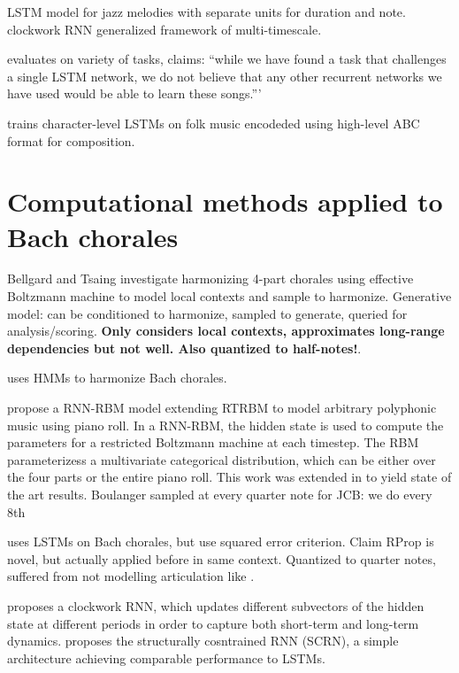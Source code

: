 \documentclass[dissertation.tex]{subfiles}
\begin{document}
LSTM model for jazz melodies with separate units for duration and note\cite{franklin2005jazz}.
\cite{Koutnik2014} clockwork RNN generalized framework of multi-timescale.

\cite{franklin2006recurrent} evaluates on variety of tasks, claims: ``while we have found a task
that challenges a single LSTM network, we do not believe that any other recurrent networks we have used
would be able to learn these songs.'''

\cite{sturm2015folk} \cite{sturm2016music} trains character-level LSTMs on folk
music encodeded using high-level ABC format for composition.

\section{Computational methods applied to Bach chorales}

Bellgard and Tsaing investigate harmonizing 4-part chorales using effective
Boltzmann machine \cite{bellgard1994harmonizing} to model local contexts and
sample to harmonize. Generative model: can be conditioned to harmonize, sampled
to generate, queried for analysis/scoring. \textbf{Only considers local contexts, approximates
long-range dependencies but not well. Also quantized to half-notes!}.

\cite{Allan2005} uses HMMs to harmonize Bach chorales.

\cite{Boulanger-Lewandowski2012} propose a RNN-RBM model extending RTRBM \cite{sutskever2009recurrent}
to model arbitrary polyphonic music using piano roll. In a RNN-RBM, the hidden
state is used to compute the parameters for a restricted Boltzmann machine at
each timestep. The RBM parameterizess a multivariate categorical distribution,
which can be either over the four parts or the entire piano roll. This work was
extended in \cite{Lyu2015} to yield state of the art results. Boulanger sampled
at every quarter note for JCB: we do every 8th 

\cite{Liu2014} uses LSTMs on Bach chorales, but use squared error criterion. Claim RProp
is novel, but actually applied before \cite{riedmiller1993direct} in same context. Quantized
to quarter notes, suffered from not modelling articulation like \cite{Eck2002}.

\cite{Koutnik2014} proposes a clockwork RNN, which updates different subvectors
of the hidden state at different periods in order to capture both short-term
and long-term dynamics. \cite{Mikolov2015} proposes the structurally
cosntrained RNN (SCRN), a simple architecture achieving comparable performance
to LSTMs.
\end{document}
